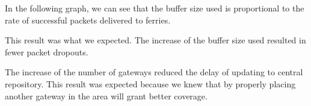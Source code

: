 In the following graph, we can see that the buffer size used is proportional to the rate of successful packets delivered to ferries.


This result was what we expected.  
The increase of the buffer size used resulted in fewer packet dropouts.



The increase of the number of gateways reduced the delay of updating to central repository.  
This result was expected because we knew that by properly placing another gateway in the area will grant better coverage.  
